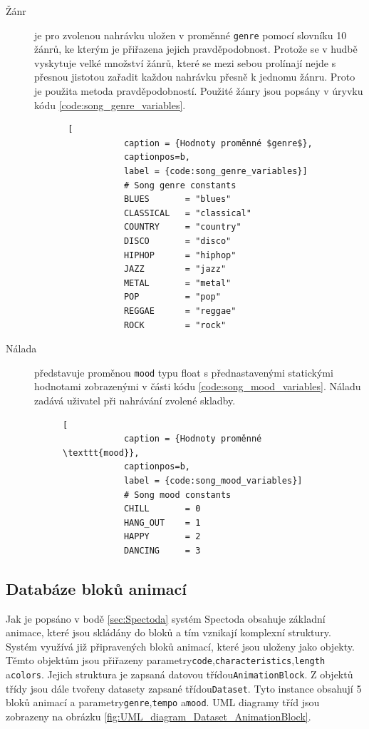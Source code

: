 \begin{description}
    \item[Žánr] je pro zvolenou nahrávku uložen v proměnné \texttt{genre} pomocí slovníku 10 žánrů, ke kterým je přiřazena jejich pravděpodobnost. Protože se v hudbě vyskytuje velké množství žánrů, které se mezi sebou prolínají nejde s přesnou jistotou zařadit každou nahrávku přesně k jednomu žánru. Proto je použita metoda pravděpodobností. Použité žánry jsou popsány v úryvku kódu \ref{code:song_genre_variables}.
    \begin{figure}[H]
        \begin{lstlisting} [
            caption = {Hodnoty proměnné $genre$},
            captionpos=b,
            label = {code:song_genre_variables}]
            # Song genre constants
            BLUES       = "blues"
            CLASSICAL   = "classical"
            COUNTRY     = "country"
            DISCO       = "disco"
            HIPHOP      = "hiphop"
            JAZZ        = "jazz"
            METAL       = "metal"
            POP         = "pop"
            REGGAE      = "reggae"
            ROCK        = "rock"
        \end{lstlisting}
    \end{figure}

    \item[Nálada] představuje proměnou \texttt{mood} typu float s přednastavenými statickými hodnotami zobrazenými v části kódu \ref{code:song_mood_variables}. Náladu zadává uživatel při nahrávání zvolené skladby.  
    \begin{figure}[H]        
        \begin{lstlisting}[
            caption = {Hodnoty proměnné \texttt{mood}},
            captionpos=b,
            label = {code:song_mood_variables}]
            # Song mood constants
            CHILL       = 0
            HANG_OUT    = 1
            HAPPY       = 2
            DANCING     = 3
        \end{lstlisting}
    \end{figure}
    
\end{description}

\subsection{Databáze bloků animací} \label{sec:Database_structure}
Jak je popsáno v bodě \ref{sec:Spectoda} systém Spectoda obsahuje základní animace, které jsou skládány do bloků a tím vznikají komplexní struktury. Systém využívá již připravených bloků animací, které jsou uloženy jako objekty. Těmto objektům jsou přiřazeny parametry\texttt{code},\texttt{characteristics},\texttt{length} a\texttt{colors}. Jejich struktura je zapsaná datovou třídou\texttt{AnimationBlock}. Z objektů třídy jsou dále tvořeny datasety zapsané třídou\texttt{Dataset}. Tyto instance obsahují 5 bloků animací a parametry\texttt{genre},\texttt{tempo} a\texttt{mood}. UML diagramy tříd jsou zobrazeny na obrázku \ref{fig:UML_diagram_Dataset_AnimationBlock}.

